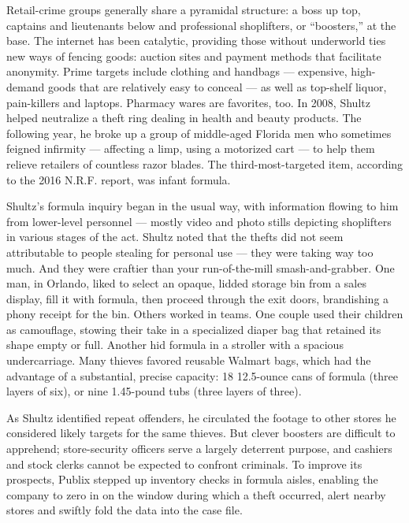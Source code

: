 Retail-crime groups generally share a pyramidal structure: a boss up
top, captains and lieutenants below and professional shoplifters, or
``boosters,'' at the base. The internet has been catalytic, providing
those without underworld ties new ways of fencing goods: auction sites
and payment methods that facilitate anonymity. Prime targets include
clothing and handbags --- expensive, high-demand goods that are
relatively easy to conceal --- as well as top-shelf liquor, pain-killers
and laptops. Pharmacy wares are favorites, too. In 2008, Shultz helped
neutralize a theft ring dealing in health and beauty products. The
following year, he broke up a group of middle-aged Florida men who
sometimes feigned infirmity --- affecting a limp, using a motorized cart
--- to help them relieve retailers of countless razor blades. The
third-most-targeted item, according to the 2016 N.R.F. report, was
infant formula.

Shultz's formula inquiry began in the usual way, with information
flowing to him from lower-level personnel --- mostly video and photo
stills depicting shoplifters in various stages of the act. Shultz noted
that the thefts did not seem attributable to people stealing for
personal use --- they were taking way too much. And they were craftier
than your run-of-the-mill smash-and-grabber. One man, in Orlando, liked
to select an opaque, lidded storage bin from a sales display, fill it
with formula, then proceed through the exit doors, brandishing a phony
receipt for the bin. Others worked in teams. One couple used their
children as camouflage, stowing their take in a specialized diaper bag
that retained its shape empty or full. Another hid formula in a stroller
with a spacious undercarriage. Many thieves favored reusable Walmart
bags, which had the advantage of a substantial, precise capacity: 18
12.5-ounce cans of formula (three layers of six), or nine 1.45-pound
tubs (three layers of three).

As Shultz identified repeat offenders, he circulated the footage to
other stores he considered likely targets for the same thieves. But
clever boosters are difficult to apprehend; store-security officers
serve a largely deterrent purpose, and cashiers and stock clerks cannot
be expected to confront criminals. To improve its prospects, Publix
stepped up inventory checks in formula aisles, enabling the company to
zero in on the window during which a theft occurred, alert nearby stores
and swiftly fold the data into the case file.

